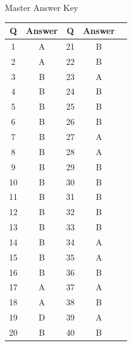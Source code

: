 \documentclass[aspectratio=169,8pt]{beamer}
\begin{document}
	\begin{frame}{Master Answer Key}
		\begin{center}
			\begin{tabular}{|c|c|c|c|c|}
				\hline
				Q & Answer & Q & Answer \\
				\hline
				1 & A & 21 & B \\
				2 & A & 22 & B \\
				3 & B & 23 & A \\
				4 & B & 24 & B \\
				5 & B & 25 & B \\
				6 & B & 26 & B \\
				7 & B & 27 & A \\
				8 & B & 28 & A \\
				9 & B & 29 & B \\
				10 & B & 30 & B \\
				11 & B & 31 & B \\
				12 & B & 32 & B \\
				13 & B & 33 & B \\
				14 & B & 34 & A \\
				15 & B & 35 & A \\
				16 & B & 36 & B \\
				17 & A & 37 & A \\
				18 & A & 38 & B \\
				19 & D & 39 & A \\
				20 & B & 40 & B \\
				\hline
			\end{tabular}
		\end{center}
	\end{frame}
	
\end{document}

